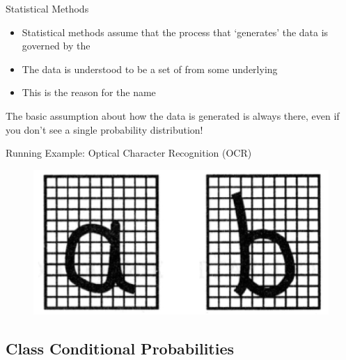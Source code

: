 \begin{frame}{Statistical Methods}{}
	\begin{itemize}
		\item Statistical methods assume that the process that `generates' the data is governed by the
		\item The data is understood to be a set of  from some
			underlying 
		\item This is the reason for the name 
	\end{itemize}
	\begin{boxBlueNoFrame}
		The basic assumption about how the data is generated is always there, even if you don't see
		a single probability distribution!
	\end{boxBlueNoFrame}
\end{frame}


\begin{frame}{Running Example: Optical Character Recognition (OCR)}{}
	\begin{figure}
		\centering
		\includegraphics[scale=0.6]{03_decision_theory/02_img/characters}
	\end{figure}
	\vspace*{-1mm}
	\footnotesize
\end{frame}


\subsection{Class Conditional Probabilities}

